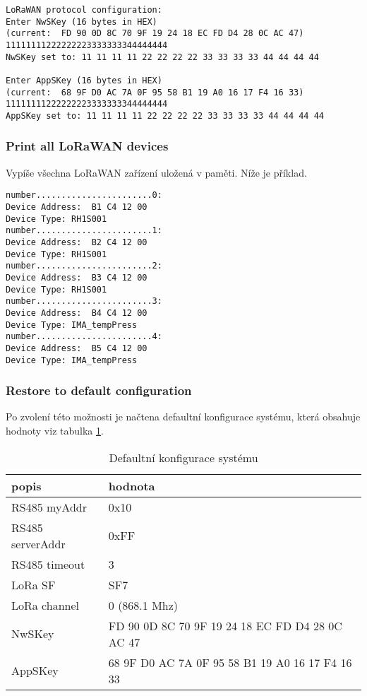 \begin{lstlisting}
LoRaWAN protocol configuration:
Enter NwSKey (16 bytes in HEX)
(current:  FD 90 0D 8C 70 9F 19 24 18 EC FD D4 28 0C AC 47)
11111111222222223333333344444444
NwSKey set to: 11 11 11 11 22 22 22 22 33 33 33 33 44 44 44 44

Enter AppSKey (16 bytes in HEX)
(current:  68 9F D0 AC 7A 0F 95 58 B1 19 A0 16 17 F4 16 33)
11111111222222223333333344444444
AppSKey set to: 11 11 11 11 22 22 22 22 33 33 33 33 44 44 44 44
\end{lstlisting}




\subsubsection{Print all LoRaWAN devices}
Vypíše všechna LoRaWAN zařízení uložená v paměti. Níže je příklad.


\begin{lstlisting}
number.......................0:
Device Address:  B1 C4 12 00
Device Type: RH1S001
number.......................1:
Device Address:  B2 C4 12 00
Device Type: RH1S001
number.......................2:
Device Address:  B3 C4 12 00
Device Type: RH1S001
number.......................3:
Device Address:  B4 C4 12 00
Device Type: IMA_tempPress
number.......................4:
Device Address:  B5 C4 12 00
Device Type: IMA_tempPress
\end{lstlisting}



\subsubsection{Restore to default configuration}
Po zvolení této možnosti je načtena defaultní konfigurace systému, která obsahuje hodnoty viz tabulka \ref{table:5}.

\begin{table}[!h]
    \centering
    \begin{tabular}{ |l|l| }
     \hline

     popis              & hodnota         \\ \hline \hline
     RS485 myAddr       & 0x10            \\ \hline
     RS485 serverAddr   & 0xFF            \\ \hline
     RS485 timeout      & 3               \\ \hline
     LoRa SF            & SF7             \\ \hline
     LoRa channel       & 0 (868.1 Mhz)   \\ \hline
     NwSKey             & FD 90 0D 8C 70 9F 19 24 18 EC FD D4 28 0C AC 47  \\ \hline
     AppSKey            & 68 9F D0 AC 7A 0F 95 58 B1 19 A0 16 17 F4 16 33  \\ \hline

    \end{tabular}
    \caption{Defaultní konfigurace systému}
    \label{table:5}
\end{table}


